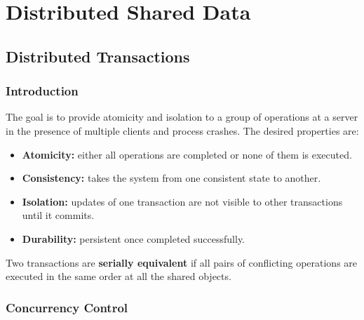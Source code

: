 \section{Distributed Shared Data}

\subsection{Distributed Transactions}

\subsubsection*{Introduction}

The goal is to provide atomicity and isolation to a group of operations at a server in the presence of multiple clients and process crashes.
The desired properties are:
\begin{itemize}
    \item \textbf{Atomicity:} either all operations are completed or none of them is executed.
    \item \textbf{Consistency:} takes the system from one consistent state to another.
    \item \textbf{Isolation:} updates of one transaction are not visible to other transactions until it commits.
    \item \textbf{Durability:} persistent once completed successfully.
\end{itemize}

Two transactions are \textbf{serially equivalent} if all pairs of conflicting operations are executed in the same order at all the shared objects.

\subsubsection*{Concurrency Control}

